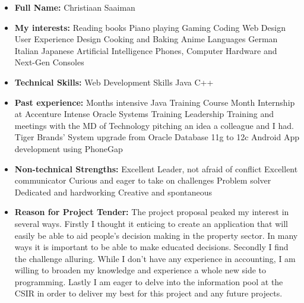\documentclass{article}
\begin{document}
    \begin{itemize}
    \item \textbf{Full Name:} Christiaan Saaiman
    \item \textbf{My interests:}
    	\subitem Reading books
        \subitem Piano playing
        \subitem Gaming
        \subitem Coding
        \subitem Web Design
        \subitem User Experience Design
        \subitem Cooking and Baking
		\subitem Anime
        \subitem Languages
        	\subsubitem German
            \subsubitem Italian
            \subsubitem Japanese
        \subitem Artificial Intelligence
        \subitem Phones, Computer Hardware and Next-Gen Consoles

	\item \textbf{Technical Skills:}
    	\subitem Web Development Skills
        \subitem Java
        \subitem C++
        
	\item \textbf{Past experience:}
    	 Months intensive Java Training Course
         Month Internship at Accenture
        	\subsubitem Intense Oracle Systems Training
            \subsubitem Leadership Training and meetings with the MD of Technology
            \subsubitem pitching an idea a colleague and I had.
            \subsubitem Tiger Brands' System upgrade from Oracle Database 11g to 12c
        \subitem Android App development using PhoneGap
    \item \textbf{Non-technical Strengths:}
    	\subitem Excellent Leader, not  afraid of conflict
        \subitem Excellent communicator
        \subitem Curious and eager to take on challenges
        \subitem Problem solver
        \subitem Dedicated and hardworking
        \subitem Creative and spontaneous
        
   \item \textbf{Reason for Project Tender:} \newline
   The project proposal peaked my interest in several ways. Firstly	I thought it enticing to create an application that will easily be able to aid people's decision making in the property sector. In many ways it is important to be able to make educated decisions. Secondly I find the challenge alluring. While I don't have any experience in accounting, I am willing to broaden my knowledge and experience a whole new side to programming. Lastly I am eager to delve into the information pool at the CSIR in order to deliver my best for this project and any future projects.
       
	\end{itemize}
	
\end{document}
